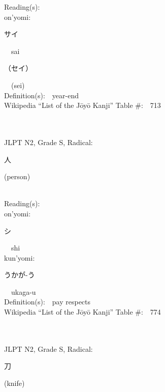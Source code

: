\begin{multicols}{2}
Reading(s):\ \ \\
{\hspace*{1em}}on'yomi:\ \ \\
{\hspace*{2em}}{\begin{CJK}{UTF8}{min} サイ \end{CJK}}\ \ sai\ \ \\
{\hspace*{2em}}{\begin{CJK}{UTF8}{min} （セイ） \end{CJK}}\ \ (sei)\ \ \\
Definition(s):\ \ year-end \\
Wikipedia ``List of the J\=oy\=o Kanji'' Table \#:\ \ 713 \\
\ \ \\
{\fontsize{34pt}{40pt}  }\ \ \\  %
{JLPT N2, Grade S, Radical:\ \ {\begin{CJK}{UTF8}{min} 人 \end{CJK}} (person) } \\
Reading(s):\ \ \\
{\hspace*{1em}}on'yomi:\ \ \\
{\hspace*{2em}}{\begin{CJK}{UTF8}{min} シ \end{CJK}}\ \ shi\ \ \\
{\hspace*{1em}}kun'yomi:\ \ \\
{\hspace*{2em}}{\begin{CJK}{UTF8}{min} うかが-う \end{CJK}}\ \ ukaga-u\ \ \\
Definition(s):\ \ pay respects \\
Wikipedia ``List of the J\=oy\=o Kanji'' Table \#:\ \ 774 \\
\ \ \\
{\fontsize{34pt}{40pt}  }\ \ \\  %
{JLPT N2, Grade S, Radical:\ \ {\begin{CJK}{UTF8}{min} 刀 \end{CJK}} (knife) } \\

\end{multicols}

